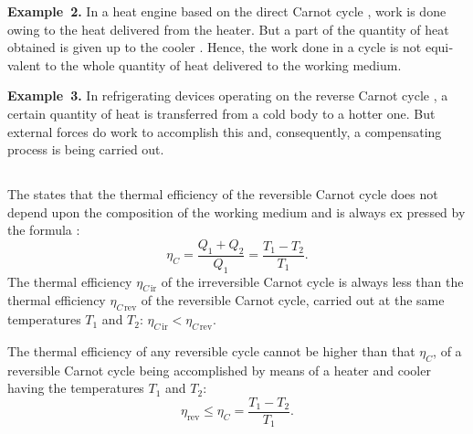 \textbf{Example~2.} In a heat engine based on the direct Carnot cycle , work is done owing to the heat delivered from the heater. But a part of the quantity of heat obtained is given up to the cooler . Hence, the work done in a cycle is not equi­valent to the whole quantity of heat delivered to the working medium.

\textbf{Example~3.} In refrigerating devices operating on the reverse Carnot cycle , a certain quantity of heat is transferred from a cold body to a hotter one. But external forces do work to accomplish this and, consequently, a compensating process is being carried out.

\subsection{}\label{11.3.4} The  states that the thermal efficiency  of the reversible Carnot cycle does not depend upon the composition of the working medium and is always ex­ pressed by the formula :
\begin{equation*}%
\eta_{C} = \frac{Q_{1}+Q_{2}}{Q_{1}} = \frac{T_{1} - T_{2}}{T_{1}}.
\end{equation*}
The thermal efficiency $\eta_{C\,\textrm{ir}}$ of the irreversible Carnot cycle is always less than the thermal efficiency $\eta_{C\,\textrm{rev}}$ of the reversible Carnot cycle, carried out at the same temperatures $T_{1}$ and $T_{2}$: $\eta_{C\,\textrm{ir}} < \eta_{C\,\textrm{rev}}$.

The thermal efficiency of any reversible cycle cannot be higher than that $\eta_{C}$, of a reversible Carnot cycle being accomplished by means of a heater and cooler having the temperatures $T_{1}$ and $T_{2}$:
\begin{equation*}%
\eta_{\textrm{rev}} \leq \eta_{C} = \frac{T_{1} - T_{2}}{T_{1}}.
\end{equation*}

